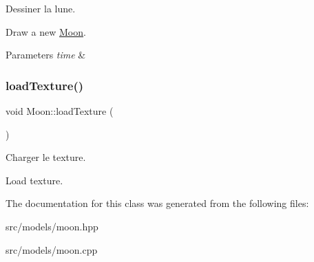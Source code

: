 Dessiner la lune. 

Draw a new \mbox{\hyperlink{classMoon}{Moon}}.


\begin{DoxyParams}{Parameters}
{\em time} & \\
\hline
\end{DoxyParams}
\mbox{\label{classMoon_afa96a9eb248c138bbb808e68a54b426c}} 
\subsubsection{\texorpdfstring{loadTexture()}{loadTexture()}}
{\footnotesize\ttfamily void Moon\+::load\+Texture (\begin{DoxyParamCaption}{ }\end{DoxyParamCaption})\hspace{0.3cm}{\ttfamily [protected]}}



Charger le texture. 

Load texture.

The documentation for this class was generated from the following files\+:\begin{DoxyCompactItemize}
\item 
src/models/moon.\+hpp\item 
src/models/moon.\+cpp\end{DoxyCompactItemize}
